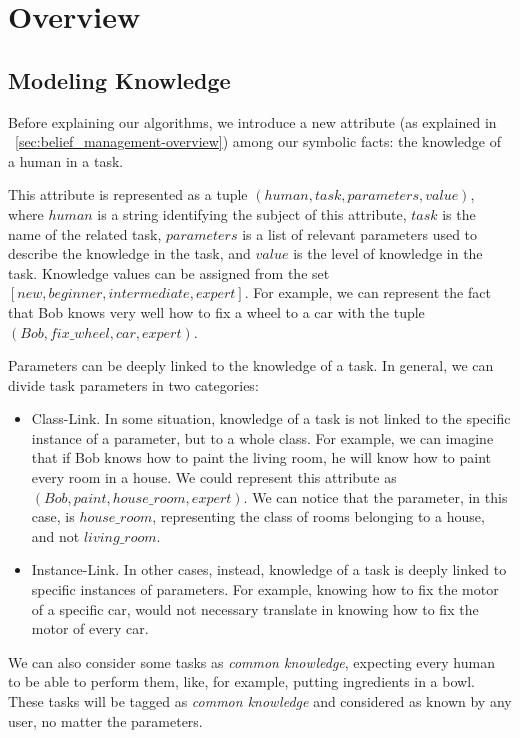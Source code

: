 \section{Overview}
\label{sec:knowledge-overview}
\subsection{Modeling Knowledge}
Before explaining our algorithms, we introduce a new attribute (as explained in ~\ref{sec:belief_management-overview}) among our symbolic facts: the knowledge of a human in a task.

This attribute is represented as a tuple $(human, task, parameters, value)$, where $human$ is a string identifying the subject of this attribute, $task$ is the name of the related task, $parameters$ is a list of relevant parameters used to describe the knowledge in the task, and $value$ is the level of knowledge in the task. Knowledge values can be assigned from the set $[new, beginner, intermediate, expert]$.  For example, we can represent the fact that Bob knows very well how to fix a wheel to a car with the tuple $(Bob, fix\_wheel, car, expert)$. 

Parameters can be deeply linked to the knowledge of a task. In general, we can divide task parameters in two categories:
\begin{itemize}
\item Class-Link. In some situation, knowledge of a task is not linked to the specific instance of a parameter, but to a whole class. For example, we can imagine that if Bob knows how to paint the living room, he will know how to paint every room in a house. We could represent this attribute as $(Bob, paint, house\_room, expert)$. We can notice that the parameter, in this case, is $house\_room$, representing the class of rooms belonging to a house, and not $living\_room$.
\item Instance-Link. In other cases, instead, knowledge of a task is deeply linked to specific instances of parameters. For example, knowing how to fix the motor of a specific car, would not necessary translate in knowing how to fix the motor of every car.
\end{itemize}

We can also consider some tasks as \textit{common knowledge}, expecting every human to be able to perform them, like, for example, putting ingredients in a bowl. These tasks will be tagged as \textit{common knowledge} and considered as known by any user, no matter the parameters. 

